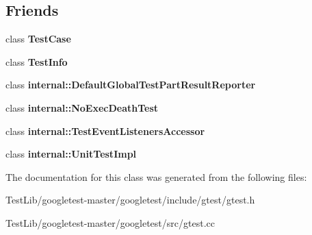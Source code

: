 \subsection*{Friends}
\begin{DoxyCompactItemize}
\item 
\mbox{\label{classtesting_1_1TestEventListeners_aff779e55b06adfa7c0088bd10253f0f0}} 
class {\bfseries Test\+Case}
\item 
\mbox{\label{classtesting_1_1TestEventListeners_a4c49c2cdb6c328e6b709b4542f23de3c}} 
class {\bfseries Test\+Info}
\item 
\mbox{\label{classtesting_1_1TestEventListeners_abae39633da9932847b41cb80efd62115}} 
class {\bfseries internal\+::\+Default\+Global\+Test\+Part\+Result\+Reporter}
\item 
\mbox{\label{classtesting_1_1TestEventListeners_afddba49fdf3f493532b4d5efb9814f4e}} 
class {\bfseries internal\+::\+No\+Exec\+Death\+Test}
\item 
\mbox{\label{classtesting_1_1TestEventListeners_addbc107b6b445617c880182bd4f44cf9}} 
class {\bfseries internal\+::\+Test\+Event\+Listeners\+Accessor}
\item 
\mbox{\label{classtesting_1_1TestEventListeners_acc0a5e7573fd6ae7ad1878613bb86853}} 
class {\bfseries internal\+::\+Unit\+Test\+Impl}
\end{DoxyCompactItemize}


The documentation for this class was generated from the following files\+:\begin{DoxyCompactItemize}
\item 
Test\+Lib/googletest-\/master/googletest/include/gtest/gtest.\+h\item 
Test\+Lib/googletest-\/master/googletest/src/gtest.\+cc\end{DoxyCompactItemize}
